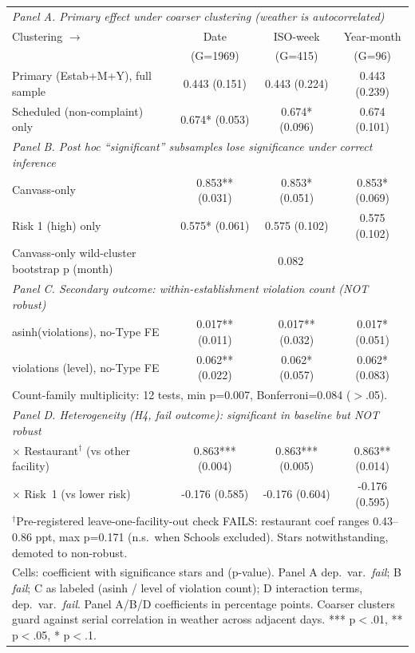 \begin{tabular}{lccc}
\hline\hline
\multicolumn{4}{l}{\emph{Panel A. Primary effect under coarser clustering (weather is autocorrelated)}}\\
Clustering $\rightarrow$ & Date & ISO-week & Year-month \\
 & (G=1969) & (G=415) & (G=96) \\
\hline
Primary (Estab+M+Y), full sample & 0.443 (0.151) & 0.443 (0.224) & 0.443 (0.239) \\
Scheduled (non-complaint) only & 0.674* (0.053) & 0.674* (0.096) & 0.674 (0.101) \\
\hline
\multicolumn{4}{l}{\emph{Panel B. Post hoc ``significant'' subsamples lose significance under correct inference}}\\
Canvass-only & 0.853** (0.031) & 0.853* (0.051) & 0.853* (0.069) \\
Risk 1 (high) only & 0.575* (0.061) & 0.575 (0.102) & 0.575 (0.102) \\
Canvass-only wild-cluster bootstrap p (month) & \multicolumn{3}{c}{0.082} \\
\hline
\multicolumn{4}{l}{\emph{Panel C. Secondary outcome: within-establishment violation count (NOT robust)}}\\
asinh(violations), no-Type FE & 0.017** (0.011) & 0.017** (0.032) & 0.017* (0.051) \\
violations (level), no-Type FE & 0.062** (0.022) & 0.062* (0.057) & 0.062* (0.083) \\
\multicolumn{4}{l}{\footnotesize \quad Count-family multiplicity: 12 tests, min p=0.007, Bonferroni=0.084 ($>$.05).}\\
\hline
\multicolumn{4}{l}{\emph{Panel D. Heterogeneity (H4, fail outcome): significant in baseline but NOT robust}}\\
$\times$ Restaurant$^\dagger$ (vs other facility) & 0.863*** (0.004) & 0.863*** (0.005) & 0.863** (0.014) \\
$\times$ Risk~1 (vs lower risk) & -0.176 (0.585) & -0.176 (0.604) & -0.176 (0.595) \\
\multicolumn{4}{l}{\footnotesize $^\dagger$Pre-registered leave-one-facility-out check FAILS: restaurant coef ranges 0.43--0.86 ppt, max p=0.171 (n.s.\ when Schools excluded). Stars notwithstanding, demoted to non-robust.}\\
\hline\hline
\multicolumn{4}{p{0.92\linewidth}}{\footnotesize Cells: coefficient with significance stars and (p-value). Panel A dep.\ var.\ \emph{fail}; B \emph{fail}; C as labeled (asinh / level of violation count); D interaction terms, dep.\ var.\ \emph{fail}. Panel A/B/D coefficients in percentage points. Coarser clusters guard against serial correlation in weather across adjacent days. *** p$<$.01, ** p$<$.05, * p$<$.1.}\\
\end{tabular}